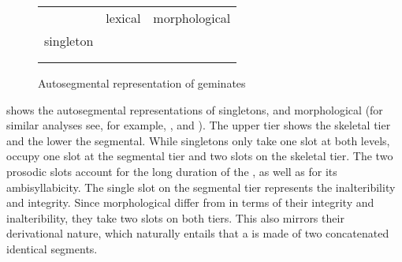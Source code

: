 \begin{figure}[h]
	\centering	
	
	\begin{tabularx}{.8\linewidth}{YYY}
		
		&		lexical			 & 		 morphological \\
		
		singleton	&			  \isi{geminate}	 & 			  \\		
		\\

		\begin{tikzpicture}[grow'=up]
		\Tree [.C C ] 					
		\end{tikzpicture}												&
		
		
		\begin{tikzpicture}[grow'=up]
		\Tree  [.C C C ];
		\end{tikzpicture}			
		&
		
		\begin{tikzpicture}[grow'=up]
		\Tree  [.C C ]
		\end{tikzpicture}
		\begin{tikzpicture}[grow'=up]
		\Tree  [.C C ]
		\end{tikzpicture}		
		
	\end{tabularx}
	
	\caption{Autosegmental representation of geminates}
	 \label{fig:Autosegmental representation of geminates} 

\end{figure}

 shows the autosegmental representations of singletons,  and morphological  (for similar analyses see, for example,  \citealt[413]{Kenstowicz.1994}, \citealt[26 f.]{Gussmann.2002} and \citealt[62]{Ridouane.2010}). The upper tier shows the skeletal tier and the lower the segmental. While singletons only take one slot at both levels,  occupy one slot at the segmental tier and two slots on the skeletal tier. The two prosodic slots account for the long duration of the , as well as for its ambisyllabicity. The single slot on the segmental tier represents the  inalteribility and integrity. Since morphological  differ from  in terms of their integrity and inalteribility, they take two slots on both tiers. This also mirrors their derivational nature, which naturally entails that a  is made of two concatenated identical segments.


